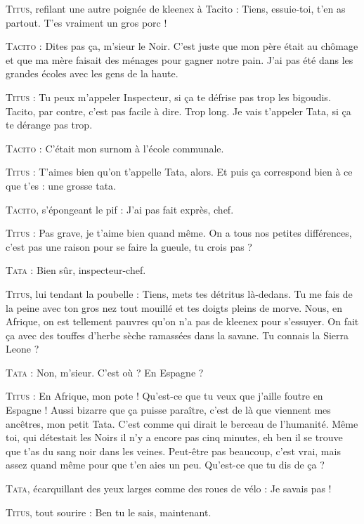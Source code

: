 \begin{dialogue}
\textsc{Titus}, refilant une autre poignée de kleenex à Tacito : Tiens, essuie-toi, t’en as partout. T’es vraiment un gros porc !

\textsc{Tacito} : Dites pas ça, m’sieur le Noir. C’est juste que mon père était au chômage et que ma mère faisait des ménages pour gagner notre pain. J’ai pas été dans les grandes écoles avec les gens de la haute.

\textsc{Titus} : Tu peux m’appeler Inspecteur, si ça te défrise pas trop les bigoudis. Tacito, par contre, c’est pas facile à dire. Trop long. Je vais t’appeler Tata, si ça te dérange pas trop.

\textsc{Tacito} : C’était mon surnom à l’école communale.

\textsc{Titus} : T’aimes bien qu’on t’appelle Tata, alors. Et puis ça correspond bien à ce que t’es : une grosse tata.

\textsc{Tacito}, s’épongeant le pif : J’ai pas fait exprès, chef.

\textsc{Titus} : Pas grave, je t’aime bien quand même. On a tous nos petites différences, c’est pas une raison pour se faire la gueule, tu crois pas ?

\textsc{Tata} : Bien sûr, inspecteur-chef.

\illusloflabel{}%
\textsc{Titus}, lui tendant la poubelle : Tiens, mets tes détritus là-dedans. Tu me fais de la peine avec ton gros nez tout mouillé et tes doigts pleins de morve. Nous, en Afrique, on est tellement pauvres qu’on n’a pas de kleenex pour s’essuyer. On fait ça avec des touffes d’herbe sèche ramassées dans la savane. Tu connais la Sierra Leone ?

\textsc{Tata} : Non, m’sieur. C’est où ? En Espagne ?

\textsc{Titus} : En Afrique, mon pote ! Qu’est-ce que tu veux que j’aille foutre en Espagne ! Aussi bizarre que ça puisse paraître, c’est de là que viennent mes ancêtres, mon petit Tata. C’est comme qui dirait le berceau de l’humanité. Même toi, qui détestait les Noirs il n’y a encore pas cinq minutes, eh ben il se trouve que t’as du sang noir dans les veines. Peut-être pas beaucoup, c’est vrai, mais assez quand même pour que t’en aies un peu. Qu’est-ce que tu dis de ça ?

\textsc{Tata}, écarquillant des yeux larges comme des roues de vélo : Je savais pas !

\textsc{Titus}, tout sourire : Ben tu le sais, maintenant.

\end{dialogue}

